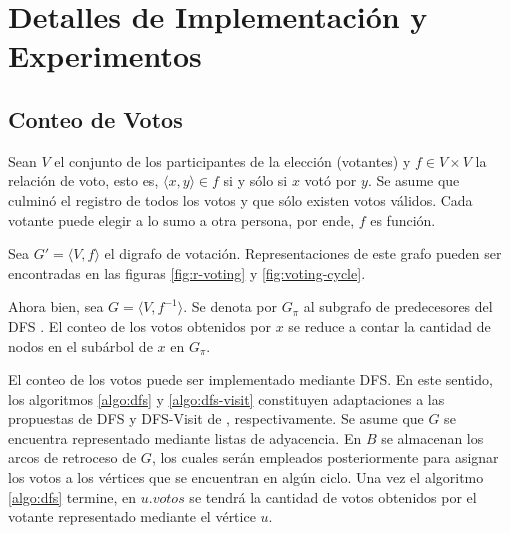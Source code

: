\chapter{Detalles de Implementación y Experimentos}\label{chapter:implementation}

\newcommand{\dfscaption}{\hyperref[algo:dfs]{DFS-Votos}}
\newcommand{\cyclevotescaption}{\hyperref[algo:votes-cycles]{Reasignar-Votos-en-Todos-los-Ciclos}}
\newcommand{\dfsvisitcaption}{\hyperref[algo:dfs-visit]{DFS-Votos-Visita}}
\newcommand{\initdfsvertices}{\hyperref[algo:init-dfs-vertices]{Inicializar-Propiedades-de-V\'ertices}}
\newcommand{\maxincyclecaption}{\hyperref[algo:max-in-cycle]{M\'ax-Votos-en-Ciclo}}
\newcommand{\setvotestoallincyclecaption}{\hyperref[algo:set-votes-all-in-cycle]{Reasignar-Votos-en-Ciclo}}





\section{Conteo de Votos}
Sean $V$ el conjunto de los participantes  de la elecci\'on (votantes) y $f \in V \times V$ la relaci\'on de voto, esto es, $ \langle x, y \rangle \in f $ si y s\'olo si $x$ vot\'o por $ y $.  Se asume que culmin\'o el registro de todos los votos y que s\'olo existen votos v\'alidos. Cada votante puede elegir a lo sumo a otra persona, por ende, $f$ es funci\'on.

Sea $G' = \langle V, f \rangle$ el digrafo de votaci\'on. Representaciones de este grafo pueden ser encontradas en las figuras \ref{fig:r-voting} y \ref{fig:voting-cycle}.

Ahora bien, sea $G = \langle V, f^{-1} \rangle$. Se denota por $G_\pi$ al subgrafo de predecesores del DFS \citep{intro-to-algo-3}. El conteo de los votos obtenidos por $x$ se reduce a contar la cantidad de nodos en el sub\'arbol de $x$ en $G_\pi$. 

El conteo de los votos puede ser implementado mediante DFS. En este sentido, los algoritmos \ref{algo:dfs} y \ref{algo:dfs-visit} constituyen adaptaciones   a las propuestas de DFS y DFS-Visit de \cite{intro-to-algo-3}, respectivamente. Se asume que $G$ se encuentra representado mediante listas de adyacencia. En $B$ se almacenan los arcos de retroceso de $G$, los cuales ser\'an empleados posteriormente para asignar los votos a los v\'ertices que se encuentran en alg\'un ciclo.  Una vez el algoritmo \ref{algo:dfs} termine, en $u.votos$ se tendr\'a la cantidad de votos obtenidos por el votante representado mediante el v\'ertice $u$.

